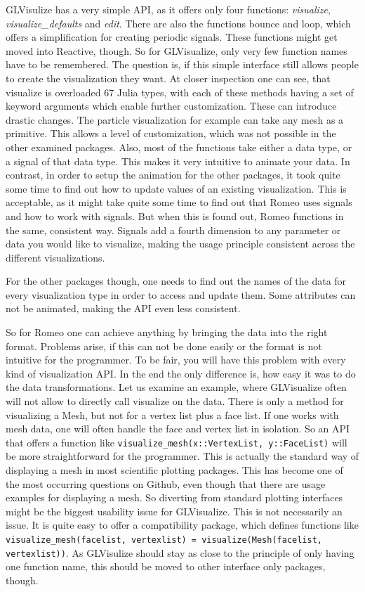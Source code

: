 GLVisulize has a very simple API, as it offers only four functions: \textit{visualize}, \textit{visualize\_defaults} and \textit{edit}.
There are also the functions bounce and loop, which offers a simplification for creating periodic signals.
These functions might get moved into Reactive, though.
So for GLVisualize, only very few function names have to be remembered.
The question is, if this simple interface still allows people to create the visualization they want.
At closer inspection one can see, that visualize is overloaded 67 Julia types, with each of these methods having a set of keyword arguments which enable further customization.
These can introduce drastic changes. The particle visualization for example can take any mesh as a primitive. This allows a level of customization, which was not possible in the other examined packages.
Also, most of the functions take either a data type, or a signal of that data type.
This makes it very intuitive to animate your data. 
In contrast, in order to setup the animation for the other packages, it took quite some time to find out how to update values of an existing visualization. This is acceptable, as it might take quite some time to find out that Romeo uses signals and how to work with signals.
But when this is found out, Romeo functions in the same, consistent way. Signals add a fourth dimension to any parameter or data you would like to visualize, making the usage principle consistent across the different visualizations.

For the other packages though, one needs to find out the names of the data for every visualization type in order to access and update them. Some attributes can not be animated, making the API even less consistent.

So for Romeo one can achieve anything by bringing the data into the right format.
Problems arise, if this can not be done easily or the format is not intuitive for the programmer.
To be fair, you will have this problem with every kind of visualization API. 
In the end the only difference is, how easy it was to do the data transformations. 
Let us examine an example, where GLVisualize often will not allow to directly call visualize on the data.
There is only a method for visualizing a Mesh, but not for a vertex list plus a face list. 
If one works with mesh data, one will often handle the face and vertex list in isolation.
So an API that offers a function like \texttt{visualize\_mesh(x::VertexList, y::FaceList)} will be more straightforward for the programmer.
This is actually the standard way of displaying a mesh in most scientific plotting packages. This has become one of the most occurring questions on Github, even though that there are usage examples for displaying a mesh.
So diverting from standard plotting interfaces might be the biggest usability issue for GLVisualize.
This is not necessarily an issue. 
It is quite easy to offer a compatibility package, which defines functions like \texttt{
visualize\_mesh(facelist, vertexlist) = visualize(Mesh(facelist, vertexlist))}.
As GLVisulize should stay as close to the principle of only having one function name, this should be moved to other interface only packages, though.

